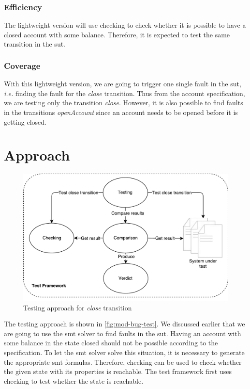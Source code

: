 \subsubsection{Efficiency}
The lightweight version will use checking to check whether it is possible to have
a closed account with some balance. Therefore, it is expected to test the same
transition in the \gls{sut}.

\subsubsection{Coverage}
With this lightweight version, we are going to trigger one single fault in the \gls{sut},
\textit{i.e.} finding the fault for the \textit{close} transition. Thus from the
account specification, we are testing only the transition \textit{close}.
However, it is also possible to find faults in the transitions
\textit{openAccount} since an account needs to be opened before it is getting
closed.

\section{Approach}

\begin{figure}[h!]
  \centering
  \includegraphics[width=\linewidth{}]{figures/test-modified-bug.pdf}
  \caption{Testing approach for \textit{close} transition}\label{fig:mod-bug-test}
\end{figure}
\FloatBarrier

The testing approach is shown in \autoref{fig:mod-bug-test}.
We discussed earlier that we are going to use the \gls{smt} solver to find faults in the
\gls{sut}. Having an account with some balance in the state closed should not be possible
according to the specification. To let the \gls{smt} solver solve this situation, it
is necessary to generate the appropriate \gls{smt} formulas. Therefore, checking can
be used to check whether the given state with its properties is reachable.
The test framework first uses checking to test whether the state is reachable.

